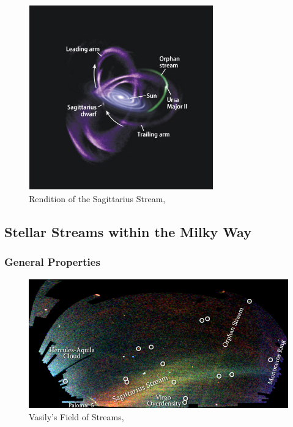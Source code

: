 \documentclass[twocolumn]{article}
\begin{document}
\begin{figure}
	\includegraphics[width=8cm]{sag_3d.jpg}
	\caption{Rendition of the Sagittarius Stream, \cite{fieldOfStreams}}
	\label{fig:sagittarius3d}
\end{figure}

\subsection{Stellar Streams within the Milky Way} 

\subsubsection{General Properties} 

\begin{figure}
	\includegraphics[width=\textwidth]{fieldofstreams.jpg}
	\caption{Vasily's Field of Streams, \cite{fieldOfStreams}}
	\label{fig:fieldOfStreams}
\end{figure}
\end{document}
